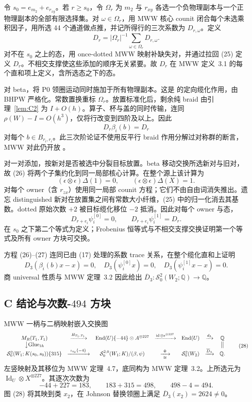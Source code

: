 \documentclass[11pt]{amsart}
\theoremstyle{definition}
\theoremstyle{remark}
\newcommand{\Q}{\mathbb{Q}}
\begin{document}
令 $s_0=e_{m_2}+e_{r_{xy}}$。若 $r\ge s_0$，令 $\Omega_r$ 为 $m_2$ 与 $r_{xy}$ 各选一个负物理副本与一个正物理副本的全部有限选择集。对 $\omega\in\Omega_r$，用 MWW 核心 counit 闭合每个未选乘积因子，用所选 44 个通道做点推，并记所得行的三次系数为 $D_{r,\omega}$。定义
\[
D_r=|\Omega_r|^{-1}\sum_{\omega\in\Omega_r}D_{r,\omega}.
\tag{25}
\]
对不在 $s_0$ 之上的态，用 once-dotted MWW 映射补缺失对，并通过拉回 (25) 定义 $D_r$。不相交支撑使这些添加的顺序无关紧要。故 $D_r$ 在 MWW 定义~3.1 的每个直和项上定义，含所选态之下的态。

对 beta，将 P0 领圈运动同时施加于所有物理副本。这是 \cite[Theorem~E]{BeliakovaPutyraWehrli2019} 的定向缆化作用，由 BHPW 严格化。常数置换重标 $\Omega_r$。放置标准化后，剩余纯 braid 由引理~\ref{lem:C2} 为 \(I+O(h)\)。算子、杯与盖的同时传输，连同 $\rho(W)-I=O(h^3)$，仅将行改变到四阶及以上。因此
\[
D_r\beta_i(b)=D_r
\tag{26}
\]
对每个 $b\in B_{r_i,r_i}$。此三次阶论证不使用反平行 braid 作用分解过对称群的断言，MWW 对此仍开放
\cite[Remark~3.3]{ManolescuWalkerWedrich2023}。

对一对添加，按新对是否被选中分裂目标放置。beta 移动交换所选新对与旧对，故 (26) 将两个子集约化到同一局部核心计算。在整个源上该计算为
\[
(\epsilon\otimes\epsilon)\Delta(1)=0,\qquad
(\epsilon\otimes\epsilon)\Delta(X)=1.
\]
对每个 owner（含 $r_{zx}$）使用同一局部 counit 方程；它们不由自由词消失推出。遗忘 distinguished 新对在放置集之间有常数大小纤维，(25) 中的归一化消去其基数。dotted 原始次数 $+2$ 被目标缆化移位 $-2$ 抵消。因此对每个 owner 与态，
\[
D_{r+e_i}\psi_i^{[0]}=0,\qquad
D_{r+e_i}\psi_i^{[1]}=D_r.
\tag{27}
\]
在 $s_0$ 之下第二个等式为定义；Frobenius 恒等式与不相交支撑交换证明第一个等式及所有 owner 方块可交换。

方程 (26)--(27) 连同已由 (17) 处理的系数 trace 关系，在整个缆化直和上证明
\[
D_3(\beta_i(b)x-x)=0,\quad
D_3(\psi_i^{[0]}x)=0,\quad
D_3(\psi_i^{[1]}x-x)=0.
\]
商 universal 性质与 MWW 定理~3.2 因此给出 $\overline D_3:\mathcal S^2_0(W_2;\Q)\to\Q$。

\subsection{C 结论与次数-$494$ 方块}

MWW 一柄与二柄映射嵌入交换图
\[
\begin{array}{ccccccc}
M_R(T_1,T_1)&\xrightarrow{H_{T_1,T_1}}&
\operatorname{End}(U)\{-44\}\otimes A^{\otimes227}
&\xrightarrow{\operatorname{id}\otimes\epsilon^{\otimes227}}&
\operatorname{End}(U)&\xrightarrow{d_3}&\Q\\
\big\downarrow{\mathrm{Glue}_{1h}}&&&&&&\big\Vert\\
\mathcal S^2_0(W_1;K(s_0,s_0))\{315\}
&\xrightarrow{\ \iota_{s_0}\{-4\}\ }&
\mathcal S^{2,0}_0(W_1;K)/(\beta,\psi)
&\xrightarrow[\cong]{\ \Phi\ }&\mathcal S^2_0(W_2)
&\xrightarrow{\overline D_3}&\Q.
\end{array}
\tag{28}
\]
左竖映射及其移位为 MWW 定理~4.7，底同构为 MWW 定理~3.2。上所选元为 $\operatorname{Id}_U\otimes X^{\otimes227}$。其逐次次数为
\[
-44+227=183,\qquad183+315=498,\qquad498-4=494.
\]
图 (28) 将其映到类 $x_2$，在 Johnson 替换领圈上满足 $\overline D_3(x_2)=2624\ne0$。
\end{document}
